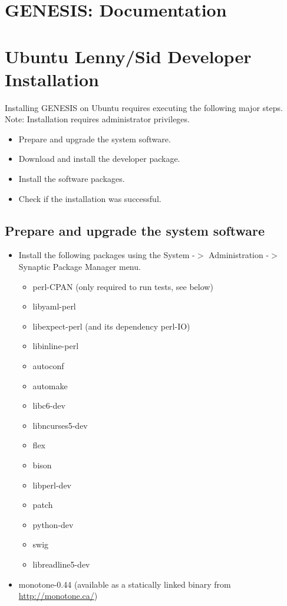 \documentclass[12pt]{article}
\begin{document}
\section*{GENESIS: Documentation}

\section*{Ubuntu Lenny/Sid Developer Installation}

Installing GENESIS on Ubuntu requires executing the following major steps. Note: Installation requires administrator privileges.
\begin{itemize}
   \item[] Prepare and upgrade the system software.
   \item[] Download and install the developer package.
   \item[] Install the software packages.
   \item[] Check if the installation was successful. 
\end{itemize}

\subsection*{Prepare and upgrade the system software}

\begin{itemize}
   \item[] Install the following packages using the System -$>$ Administration -$>$ Synaptic Package Manager menu.
      \begin{itemize}
         \item perl-CPAN (only required to run tests, see below)
         \item libyaml-perl
         \item libexpect-perl (and its dependency perl-IO)
         \item libinline-perl
         \item autoconf
         \item automake
         \item libc6-dev
         \item libncurses5-dev
         \item flex
         \item bison
         \item libperl-dev
         \item patch
         \item python-dev
         \item swig
         \item libreadline5-dev 
      \end{itemize}
   \item[] monotone-0.44 (available as a statically linked binary from \href{http://monotone.ca/}{http://monotone.ca/}) 
 \end{itemize}
\end{document}
